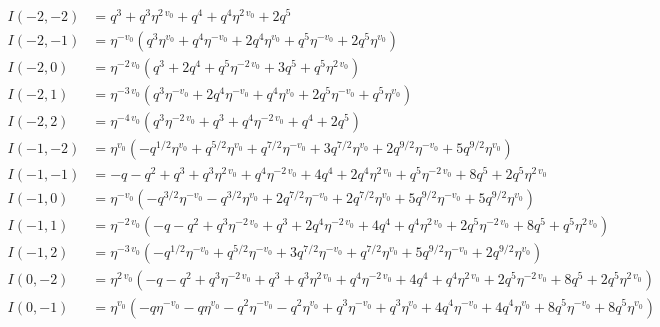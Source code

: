\documentclass[11pt,a4paper]{article}
\begin{document}
\begin{align*}
I(-2, -2) &= q^{3} + q^{3} \eta^{2 \, v_{0}} + q^{4} + q^{4} \eta^{2 \, v_{0}} + 2 q^{5} \\
I(-2, -1) &= \eta^{-v_{0}} \left( q^{3} \eta^{v_{0}} + q^{4} \eta^{-v_{0}} + 2 q^{4} \eta^{v_{0}} + q^{5} \eta^{-v_{0}} + 2 q^{5} \eta^{v_{0}} \right) \\
I(-2, 0) &= \eta^{-2 \, v_{0}} \left( q^{3} + 2 q^{4} + q^{5} \eta^{-2 \, v_{0}} + 3 q^{5} + q^{5} \eta^{2 \, v_{0}} \right) \\
I(-2, 1) &= \eta^{-3 \, v_{0}} \left( q^{3} \eta^{-v_{0}} + 2 q^{4} \eta^{-v_{0}} + q^{4} \eta^{v_{0}} + 2 q^{5} \eta^{-v_{0}} + q^{5} \eta^{v_{0}} \right) \\
I(-2, 2) &= \eta^{-4 \, v_{0}} \left( q^{3} \eta^{-2 \, v_{0}} + q^{3} + q^{4} \eta^{-2 \, v_{0}} + q^{4} + 2 q^{5} \right) \\
I(-1, -2) &= \eta^{v_{0}} \left( -q^{1/2} \eta^{v_{0}} + q^{5/2} \eta^{v_{0}} + q^{7/2} \eta^{-v_{0}} + 3 q^{7/2} \eta^{v_{0}} + 2 q^{9/2} \eta^{-v_{0}} + 5 q^{9/2} \eta^{v_{0}} \right) \\
I(-1, -1) &= -q - q^{2} + q^{3} + q^{3} \eta^{2 \, v_{0}} + q^{4} \eta^{-2 \, v_{0}} + 4 q^{4} + 2 q^{4} \eta^{2 \, v_{0}} + q^{5} \eta^{-2 \, v_{0}} + 8 q^{5} + 2 q^{5} \eta^{2 \, v_{0}} \\
I(-1, 0) &= \eta^{-v_{0}} \left( -q^{3/2} \eta^{-v_{0}} - q^{3/2} \eta^{v_{0}} + 2 q^{7/2} \eta^{-v_{0}} + 2 q^{7/2} \eta^{v_{0}} + 5 q^{9/2} \eta^{-v_{0}} + 5 q^{9/2} \eta^{v_{0}} \right) \\
I(-1, 1) &= \eta^{-2 \, v_{0}} \left( -q - q^{2} + q^{3} \eta^{-2 \, v_{0}} + q^{3} + 2 q^{4} \eta^{-2 \, v_{0}} + 4 q^{4} + q^{4} \eta^{2 \, v_{0}} + 2 q^{5} \eta^{-2 \, v_{0}} + 8 q^{5} + q^{5} \eta^{2 \, v_{0}} \right) \\
I(-1, 2) &= \eta^{-3 \, v_{0}} \left( -q^{1/2} \eta^{-v_{0}} + q^{5/2} \eta^{-v_{0}} + 3 q^{7/2} \eta^{-v_{0}} + q^{7/2} \eta^{v_{0}} + 5 q^{9/2} \eta^{-v_{0}} + 2 q^{9/2} \eta^{v_{0}} \right) \\
I(0, -2) &= \eta^{2 \, v_{0}} \left( -q - q^{2} + q^{3} \eta^{-2 \, v_{0}} + q^{3} + q^{3} \eta^{2 \, v_{0}} + q^{4} \eta^{-2 \, v_{0}} + 4 q^{4} + q^{4} \eta^{2 \, v_{0}} + 2 q^{5} \eta^{-2 \, v_{0}} + 8 q^{5} + 2 q^{5} \eta^{2 \, v_{0}} \right) \\
I(0, -1) &= \eta^{v_{0}} \left( -q \eta^{-v_{0}} - q \eta^{v_{0}} - q^{2} \eta^{-v_{0}} - q^{2} \eta^{v_{0}} + q^{3} \eta^{-v_{0}} + q^{3} \eta^{v_{0}} + 4 q^{4} \eta^{-v_{0}} + 4 q^{4} \eta^{v_{0}} + 8 q^{5} \eta^{-v_{0}} + 8 q^{5} \eta^{v_{0}} \right) \\

\end{align*}
\end{document}
